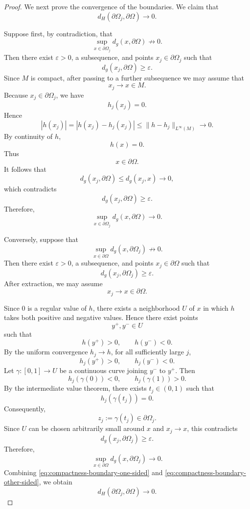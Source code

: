 \documentclass[10pt,a4paper]{amsart}
\begin{document}
\begin{proof}
We next prove the convergence of the boundaries. We claim that
\begin{equation}
d_H(\partial\Omega_j,\partial\Omega)
\longrightarrow0.
\label{eq:compactness-boundary-Hausdorff}
\end{equation}

Suppose first, by contradiction, that
\[
\sup_{x\in\partial\Omega_j}
d_g(x,\partial\Omega)
\not\longrightarrow0.
\]
Then there exist $\varepsilon>0$, a subsequence, and points
$x_j\in\partial\Omega_j$ such that
\[
d_g(x_j,\partial\Omega)\ge\varepsilon.
\]
Since $M$ is compact, after passing to a further subsequence we may
assume that
\[
x_j\longrightarrow x\in M.
\]
Because $x_j\in\partial\Omega_j$, we have
\[
h_j(x_j)=0.
\]
Hence
\[
|h(x_j)|
=
|h(x_j)-h_j(x_j)|
\le
\|h-h_j\|_{L^\infty(M)}
\longrightarrow0.
\]
By continuity of $h$,
\[
h(x)=0.
\]
Thus
\[
x\in\partial\Omega.
\]
It follows that
\[
d_g(x_j,\partial\Omega)
\le d_g(x_j,x)
\longrightarrow0,
\]
which contradicts
\[
d_g(x_j,\partial\Omega)\ge\varepsilon.
\]
Therefore,
\begin{equation}
\sup_{x\in\partial\Omega_j}
d_g(x,\partial\Omega)
\longrightarrow0.
\label{eq:compactness-boundary-one-sided}
\end{equation}

Conversely, suppose that
\[
\sup_{x\in\partial\Omega}
d_g(x,\partial\Omega_j)
\not\longrightarrow0.
\]
Then there exist $\varepsilon>0$, a subsequence, and points
$x_j\in\partial\Omega$ such that
\[
d_g(x_j,\partial\Omega_j)\ge\varepsilon.
\]
After extraction, we may assume
\[
x_j\longrightarrow x\in\partial\Omega.
\]

Since $0$ is a regular value of $h$, there exists a neighborhood $U$
of $x$ in which $h$ takes both positive and negative values. Hence
there exist points
\[
y^+,y^-\in U
\]
such that
\[
h(y^+)>0,
\qquad
h(y^-)<0.
\]
By the uniform convergence $h_j\to h$, for all sufficiently large $j$,
\[
h_j(y^+)>0,
\qquad
h_j(y^-)<0.
\]
Let $\gamma:[0,1]\to U$ be a continuous curve joining $y^-$ to
$y^+$. Then
\[
h_j(\gamma(0))<0,
\qquad
h_j(\gamma(1))>0.
\]
By the intermediate value theorem, there exists
$t_j\in(0,1)$ such that
\[
h_j(\gamma(t_j))=0.
\]
Consequently,
\[
z_j:=\gamma(t_j)\in\partial\Omega_j.
\]
Since $U$ can be chosen arbitrarily small around $x$ and
$x_j\to x$, this contradicts
\[
d_g(x_j,\partial\Omega_j)\ge\varepsilon.
\]
Therefore,
\begin{equation}
\sup_{x\in\partial\Omega}
d_g(x,\partial\Omega_j)
\longrightarrow0.
\label{eq:compactness-boundary-other-sided}
\end{equation}
Combining \eqref{eq:compactness-boundary-one-sided} and
\eqref{eq:compactness-boundary-other-sided}, we obtain
\[
d_H(\partial\Omega_j,\partial\Omega)\longrightarrow0.
\]


\end{proof}
\end{document}
